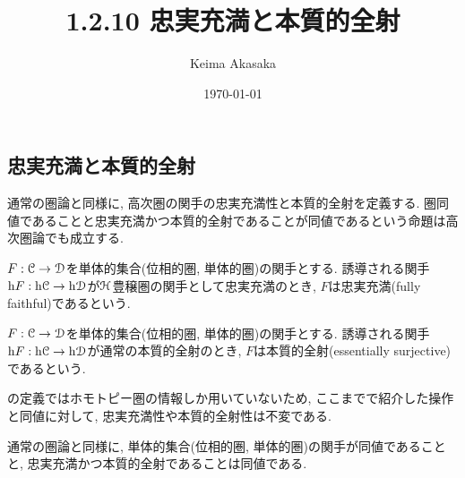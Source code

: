 \documentclass[uplatex, a4paper, 14Q, dvipdfmx]{jsreport}
\title{1.2.10 忠実充満と本質的全射}
\author{Keima Akasaka}
\date{\today}
\begin{document}

\setcounter{chapter}{1}
\setcounter{section}{2} 
\setcounter{subsection}{9}   
\setcounter{subsubsection}{1}

\subsection{忠実充満と本質的全射}

通常の圏論と同様に, 高次圏の関手の忠実充満性と本質的全射を定義する. 
圏同値であることと忠実充満かつ本質的全射であることが同値であるという命題は高次圏論でも成立する. 

\begin{definition} \label{def.1.2.10.1}
  $F : \mathcal{C} \to \mathcal{D}$を単体的集合(位相的圏, 単体的圏)の関手とする.
  誘導される関手$\mathrm{h} F : \mathrm{h}\mathcal{C} \to \mathrm{h}\mathcal{D}$が$\mathcal{H}$豊穣圏の関手として忠実充満のとき, $F$は忠実充満(fully faithful)であるという. 
  
  $F : \mathcal{C} \to \mathcal{D}$を単体的集合(位相的圏, 単体的圏)の関手とする.
  誘導される関手$\mathrm{h} F : \mathrm{h}\mathcal{C} \to \mathrm{h}\mathcal{D}$が通常の本質的全射のとき, $F$は本質的全射(essentially surjective)であるという.
\end{definition}

\begin{remark} \label{rem.1.2.10.2}
  の定義ではホモトピー圏の情報しか用いていないため, ここまでで紹介した操作と同値に対して, 忠実充満性や本質的全射性は不変である. 
\end{remark}

通常の圏論と同様に, 単体的集合(位相的圏, 単体的圏)の関手が同値であることと, 忠実充満かつ本質的全射であることは同値である. 
\end{document}

